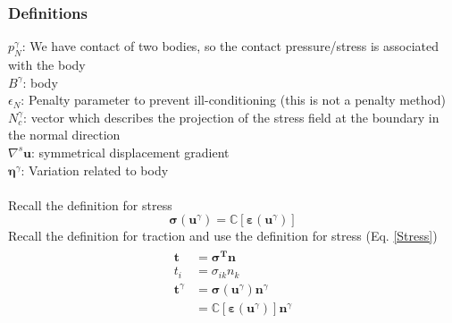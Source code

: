 \documentclass[12pt,3p]{article}
\numberwithin{equation}{section}
\begin{document}
\subsubsection{Definitions}
$p_N^\gamma$: We have contact of two bodies, so the contact pressure/stress is associated with the body \\$B^\gamma$: body \\
$\epsilon_N$: Penalty parameter to prevent ill-conditioning (this is not a penalty method) \\
$N_c^\gamma$: vector which describes the projection of the stress field at the boundary in the normal direction \\
$\nabla^s \mathbf{u}$: symmetrical displacement gradient \\ 
$\pmb{\eta}^{\gamma}$: Variation related to body \\ \\
Recall the definition for stress
\begin{equation}\label{Stress}
\pmb{\sigma} (\pmb{u}^\gamma) = \mathbb{C} [\pmb{\varepsilon} (\mathbf{u}^\gamma)]
\end{equation}
Recall the definition for traction and use the definition for stress (Eq. \ref{Stress})
\begin{align}\label{CauchyT}	%
\begin{split}
\mathbf{t} &= \pmb{\sigma^T} \mathbf{n} \\
	   t_i &= \sigma_{ik} n_k \\
	   \mathbf{t}^\gamma &= \pmb{\sigma} (\mathbf{u}^\gamma) \mathbf{n}^\gamma \\
	   				&= \mathbb{C} [\pmb{\varepsilon} (\mathbf{u}^\gamma)] \mathbf{n}^\gamma
\end{split}
\end{align}
\end{document}
